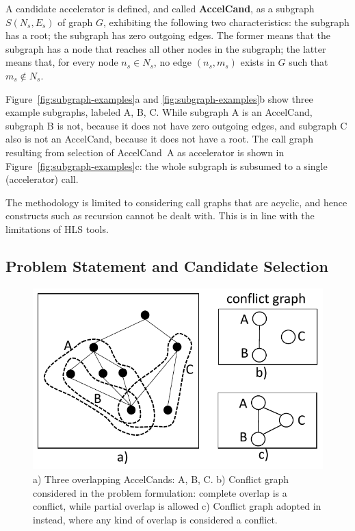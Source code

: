 \documentclass[]{usiinfthesis}
\newcommand{\candidate}{{AccelCand}}
\newcommand{\candidates}{{AccelCand}s}
\begin{document}
A candidate accelerator is defined, and called \textbf{\candidate},
as a subgraph $S(N_s,E_s)$ of graph $G$, exhibiting the following two
characteristics: the subgraph has a root; the subgraph has zero
outgoing edges. The former means that the subgraph has a node that
reaches all other nodes in the subgraph; the latter means that, for
every node $n_s \in N_s$, no edge $(n_s,m_s)$ exists in $G$ such that
$m_s \notin N_s$.\par

Figure~\ref{fig:subgraph-examples}a and \ref{fig:subgraph-examples}b
show three example subgraphs, labeled A, B, C. While subgraph A is an
\candidate, subgraph B is not, because it does not have zero outgoing
edges, and subgraph C also is not an \candidate, because it does not
have a root. The call graph resulting from selection of \candidate\ A
as accelerator is shown in Figure~\ref{fig:subgraph-examples}c: the
whole subgraph is subsumed to a single (accelerator) call.\par

The methodology is limited to considering call graphs that are
acyclic, and hence constructs such as recursion cannot be dealt with. This 
is in line with the limitations of HLS tools.

\subsection{Problem Statement and Candidate Selection}
\label{sec:as_prob}

\begin{figure}[!t]
  \centering
  \includegraphics[width=.5\linewidth]{figs/overlap_examples.pdf}
  \caption{a) Three overlapping \candidates: A, B, C. b)
          Conflict graph considered in the problem formulation:
          complete overlap is a conflict, while partial overlap is
          allowed c) Conflict graph adopted in
          \cite{ZacharopoulosApr19} instead, where any kind of overlap
          is considered a conflict. 
}
  \label{fig:overlap-examples}
\end{figure}
\end{document}
